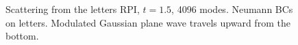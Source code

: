{
\newcommand{\width}{8cm}
\begin{figure}[htb]
\begin{center}
\end{center}
\caption{Scattering from the letters RPI, $t=1.5$, 4096 modes.
    Neumann BCs on letters. Modulated Gaussian plane wave travels upward from the bottom.}
\label{fig:rpiScattering4096Neumann}
\end{figure}
}







